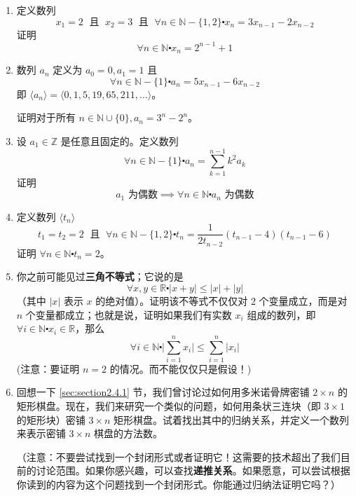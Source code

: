 \begin{enumerate}[label=(\arabic*)]
    \item 定义数列
        \[x_1=2 \;\text{ 且 }\; x_2=3 \;\text{ 且 }\; \forall n \in \mathbb{N}-\{1,2\} \centerdot x_n=3x_{n-1}-2x_{n-2}\]
        证明
        \[\forall n \in \mathbb{N} \centerdot x_n = 2^{n-1} + 1\]
    \item 数列 $a_n$ 定义为 $a_0 = 0, a_1 = 1$ 且
        \[\forall n \in \mathbb{N}-\{1\} \centerdot a_n=5x_{n-1}-6x_{n-2}\]
        即 $\langle a_n \rangle = \langle 0, 1, 5, 19, 65, 211, \dots \rangle$。
        
        证明对于所有 $n \in \mathbb{N} \cup \{0\}, a_n = 3^n-2^n$。
    \item 设 $a_1 \in \mathbb{Z}$ 是任意且固定的。定义数列
        \[\forall n \in \mathbb{N} - \{1\} \centerdot a_n = \sum_{k=1}^{n-1}k^2a_k\]
        证明
        \[a_1 \text{ 为偶数} \implies \forall n \in \mathbb{N} \centerdot a_n \text{ 为偶数}\]
    \item 定义数列 $\langle t_n \rangle$
        \[t_1=t_2=2 \;\text{ 且 }\; \forall n \in \mathbb{N}-\{1,2\} \centerdot t_n=\frac{1}{2t_{n-2}}(t_{n-1}-4)(t_{n-1}-6)\]
        证明 $\forall n \in \mathbb{N} \centerdot t_n=2$。
    \item 你之前可能见过\textbf{三角不等式}；它说的是
        \[\forall x,y \in \mathbb{R} \centerdot |x+y| \le |x| + |y|\]
        （其中 $|x|$ 表示 $x$ 的绝对值）。证明该不等式不仅仅对 $2$ 个变量成立，而是对 $n$ 个变量都成立；也就是说，证明如果我们有实数 $x_i$ 组成的数列，即 $\forall i \in \mathbb{N} \centerdot x_i \in \mathbb{R}$，那么
        \[\forall i \in \mathbb{N} \centerdot \vert \sum_{i=1}^{n} x_i \vert \le \sum_{i=1}^{n} |x_i|\]
        (注意：要证明 $n = 2$ 的情况。而不能仅仅只是假设！)
    \item 回想一下 \ref{sec:section2.4.1} 节，我们曾讨论过如何用多米诺骨牌密铺 $2 \times n$ 的矩形棋盘。现在，我们来研究一个类似的问题，如何用条状三连块（即 $3 \times 1$ 的矩形块）密铺 $3 \times n$ 矩形棋盘。试着找出其中的归纳关系，并定义一个数列来表示密铺 $3 \times n$ 棋盘的方法数。

    （注意：不要尝试找到一个封闭形式或者证明它！这需要的技术超出了我们目前的讨论范围。如果你感兴趣，可以查找\textbf{递推关系}。如果愿意，可以尝试根据你读到的内容为这个问题找到一个封闭形式。你能通过归纳法证明它吗？）
\end{enumerate}